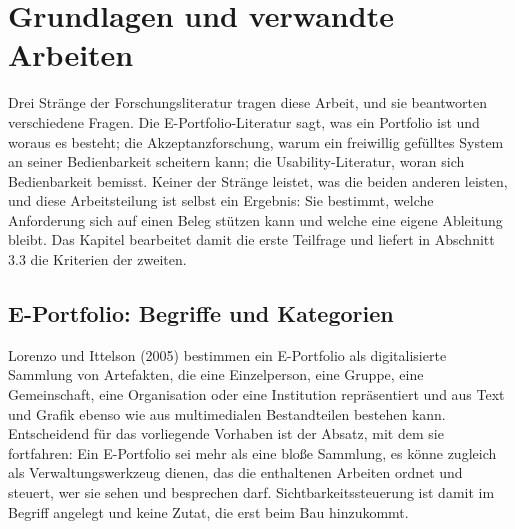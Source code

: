 
\chapter{Grundlagen und verwandte Arbeiten}
\label{kap:grundlagen}

Drei Stränge der Forschungsliteratur tragen diese Arbeit, und sie beantworten verschiedene Fragen. Die E-Portfolio-Literatur sagt, was ein Portfolio ist und woraus es besteht; die Akzeptanzforschung, warum ein freiwillig gefülltes System an seiner Bedienbarkeit scheitern kann; die Usability-Literatur, woran sich Bedienbarkeit bemisst. Keiner der Stränge leistet, was die beiden anderen leisten, und diese Arbeitsteilung ist selbst ein Ergebnis: Sie bestimmt, welche Anforderung sich auf einen Beleg stützen kann und welche eine eigene Ableitung bleibt. Das Kapitel bearbeitet damit die erste Teilfrage und liefert in Abschnitt 3.3 die Kriterien der zweiten.

\section{E-Portfolio: Begriffe und Kategorien}
\label{sec:eportfolio-begriffe}

Lorenzo und Ittelson (2005) bestimmen ein E-Portfolio als digitalisierte Sammlung von Artefakten, die eine Einzelperson, eine Gruppe, eine Gemeinschaft, eine Organisation oder eine Institution repräsentiert und aus Text und Grafik ebenso wie aus multimedialen Bestandteilen bestehen kann. Entscheidend für das vorliegende Vorhaben ist der Absatz, mit dem sie fortfahren: Ein E-Portfolio sei mehr als eine bloße Sammlung, es könne zugleich als Verwaltungswerkzeug dienen, das die enthaltenen Arbeiten ordnet und steuert, wer sie sehen und besprechen darf. Sichtbarkeitssteuerung ist damit im Begriff angelegt und keine Zutat, die erst beim Bau hinzukommt.

